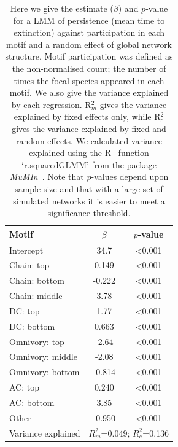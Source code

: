 \documentclass[12pt]{article}
\begin{document}
\begin{spacing}{2.0}
		\begin{table}[hb!]
    		\caption{Here we give the estimate ($\beta$) and $p$-value for a LMM of persistence (mean time to extinction) against participation in each motif and a random effect of global network structure. Motif participation was defined as the non-normalised count; the number of times the focal species appeared in each motif. We also give the variance explained by each regression. R$^{2}_{m}$ gives the variance explained by fixed effects only, while R$^{2}_{c}$ gives the variance explained by fixed and random effects. We calculated variance explained using the R~\citep{R} function `r.squaredGLMM' from the package \emph{MuMIn}~\citep{MuMIn}. Note that $p$-values depend upon sample size and that with a large set of simulated networks it is easier to meet a significance threshold.}
    		\label{tab:Z_positions}
    		\begin{tabular}{l | c c}
    		Motif & $\beta$ & $p$-value \\  
    		\hline
            Intercept	&	34.7	&	\textless0.001	\\
            Chain: top	&	0.149	&	\textless0.001	\\
            Chain: bottom	&	-0.222	&	\textless0.001	\\
            Chain: middle	&	3.78	&	\textless0.001	\\
            DC: top	&	1.77	&	\textless0.001	\\
            DC: bottom	&	0.663	&	\textless0.001	\\
            Omnivory: top	&	-2.64	&	\textless0.001	\\
            Omnivory: middle	&	-2.08	&	\textless0.001	\\
            Omnivory: bottom	&	-0.814	&	\textless0.001	\\
            AC: top	&	0.240	&	\textless0.001	\\
            AC: bottom	&	3.85	&	\textless0.001	\\
            Other	&	-0.950	&	\textless0.001	\\
            \hline
    		Variance explained & \multicolumn{2}{c}{$R^{2}_m$=0.049; $R^2_c$=0.136} \\
    		\hline
    		\end{tabular}
    		\end{table}


\end{spacing}
\end{document}
